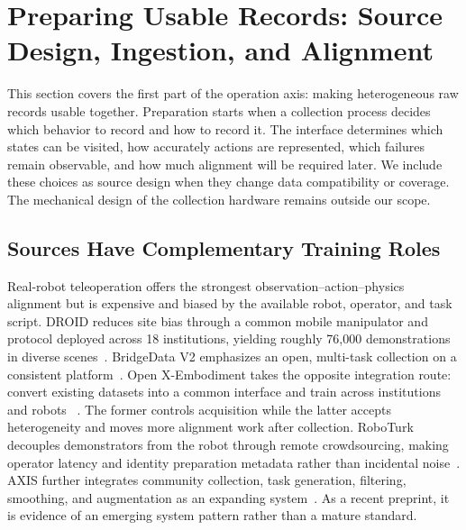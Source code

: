 \section{Preparing Usable Records: Source Design, Ingestion, and Alignment}
\label{sec:acquisition}

This section covers the first part of the operation axis: making heterogeneous raw records usable together.
Preparation starts when a collection process decides which behavior to record and how to record it.
The interface determines which states can be visited, how accurately actions are represented, which failures remain observable, and how much alignment will be required later.
We include these choices as source design when they change data compatibility or coverage.
The mechanical design of the collection hardware remains outside our scope.

\subsection{Sources Have Complementary Training Roles}

Real-robot teleoperation offers the strongest observation--action--physics alignment but is expensive and biased by the available robot, operator, and task script.
DROID reduces site bias through a common mobile manipulator and protocol deployed across 18 institutions, yielding roughly 76,000 demonstrations in diverse scenes~\cite{khazatsky2024droid_2403_12945}.
BridgeData V2 emphasizes an open, multi-task collection on a consistent platform~\cite{walke2023bridgedata_2308_12952}.
Open X-Embodiment takes the opposite integration route: convert existing datasets into a common interface and train across institutions and robots ~\cite{collaboration2023open_2310_08864}.
The former controls acquisition while the latter accepts heterogeneity and moves more alignment work after collection.
RoboTurk decouples demonstrators from the robot through remote crowdsourcing, making operator latency and identity preparation metadata rather than incidental noise~\cite{mandlekar2018roboturk_1811_02790}.
AXIS further integrates community collection, task generation, filtering, smoothing, and augmentation as an expanding system~\cite{zhao2026axis_2607_21588}.
As a recent preprint, it is evidence of an emerging system pattern rather than a mature standard.

